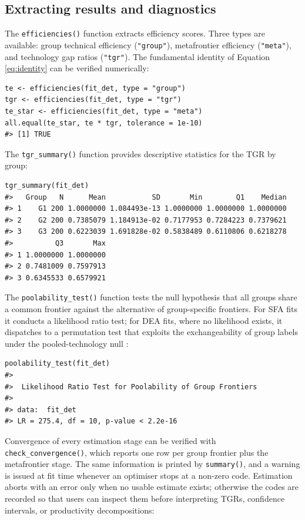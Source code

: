 \subsection{Extracting results and diagnostics}\label{sec:extracting-results}

The \texttt{efficiencies()} function extracts efficiency scores. Three types are
available: group technical efficiency (\texttt{"group"}), metafrontier efficiency
(\texttt{"meta"}), and technology gap ratios (\texttt{"tgr"}). The fundamental identity
of Equation \eqref{eq:identity} can be verified numerically:

\begin{verbatim}
te <- efficiencies(fit_det, type = "group")
tgr <- efficiencies(fit_det, type = "tgr")
te_star <- efficiencies(fit_det, type = "meta")
all.equal(te_star, te * tgr, tolerance = 1e-10)
#> [1] TRUE
\end{verbatim}

The \texttt{tgr\_summary()} function provides descriptive statistics for the TGR by
group:

\begin{verbatim}
tgr_summary(fit_det)
#>   Group   N      Mean           SD       Min        Q1    Median
#> 1    G1 200 1.0000000 1.084493e-13 1.0000000 1.0000000 1.0000000
#> 2    G2 200 0.7385079 1.184913e-02 0.7177953 0.7284223 0.7379621
#> 3    G3 200 0.6223039 1.691828e-02 0.5838489 0.6110806 0.6218278
#>          Q3       Max
#> 1 1.0000000 1.0000000
#> 2 0.7481009 0.7597913
#> 3 0.6345533 0.6579921
\end{verbatim}

The \texttt{poolability\_test()} function tests the null hypothesis that all groups
share a common frontier against the alternative of group-specific
frontiers. For SFA fits it conducts a likelihood ratio test; for DEA fits,
where no likelihood exists, it dispatches to a permutation test that
exploits the exchangeability of group labels under the pooled-technology
null \citep{simar2007, kneip2016}:

\begin{verbatim}
poolability_test(fit_det)
#> 
#>  Likelihood Ratio Test for Poolability of Group Frontiers
#> 
#> data:  fit_det
#> LR = 275.4, df = 10, p-value < 2.2e-16
\end{verbatim}

Convergence of every estimation stage can be verified with
\texttt{check\_convergence()}, which reports one row per group frontier plus the
metafrontier stage. The same information is printed by \texttt{summary()}, and a
warning is issued at fit time whenever an optimiser stops at a non-zero
code. Estimation aborts with an error only when no usable estimate exists;
otherwise the codes are recorded so that users can inspect them before
interpreting TGRs, confidence intervals, or productivity decompositions:

